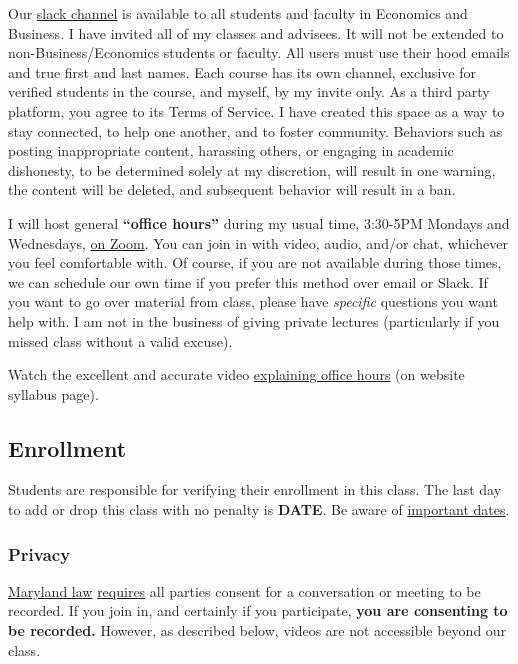 \documentclass{article}
\begin{document}
Our \href{https://hoodcollegeeconomics.slack.com}{slack channel} is
available to all students and faculty in Economics and Business. I have
invited all of my classes and advisees. It will not be extended to
non-Business/Economics students or faculty. All users must use their
hood emails and true first and last names. Each course has its own
channel, exclusive for verified students in the course, and myself, by
my invite only. As a third party platform, you agree to its Terms of
Service. I have created this space as a way to stay connected, to help
one another, and to foster community. Behaviors such as posting
inappropriate content, harassing others, or engaging in academic
dishonesty, to be determined solely at my discretion, will result in one
warning, the content will be deleted, and subsequent behavior will
result in a ban.

I will host general \textbf{``office hours''} during my usual time,
3:30-5PM Mondays and Wednesdays, \href{https://zoom.us/j/458617463}{on
Zoom}. You can join in with video, audio, and/or chat, whichever you
feel comfortable with. Of course, if you are not available during those
times, we can schedule our own time if you prefer this method over email
or Slack. If you want to go over material from class, please have
\emph{specific} questions you want help with. I am not in the business
of giving private lectures (particularly if you missed class without a
valid excuse).

Watch the excellent and accurate video
\href{https://vimeo.com/270014784}{explaining office hours} (on website
syllabus page).

\hypertarget{enrollment}{%
\subsection*{Enrollment}\label{enrollment}}

Students are responsible for verifying their enrollment in this class.
The last day to add or drop this class with no penalty is \textbf{DATE}.
Be aware of
\href{https://www.hood.edu/offices-services/registrars-office/academic-calendar}{important
dates}.

\hypertarget{privacy}{%
\subsubsection*{Privacy}\label{privacy}}

\href{https://www.execvision.io/blog/maryland-call-recording-laws/}{Maryland
law}
\href{https://law.justia.com/codes/maryland/2005/gcj/10-402.html}{requires}
all parties consent for a conversation or meeting to be recorded. If you
join in, and certainly if you participate, \textbf{you are consenting to
be recorded.} However, as described below, videos are not accessible
beyond our class.
\end{document}
